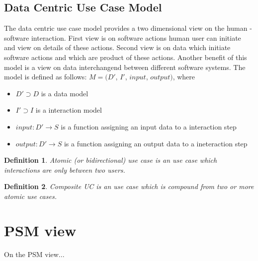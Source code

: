 \documentclass[10pt,a4paper]{article}
\newtheorem{mydef}{Definition}
\begin{document}
\subsection{Data Centric Use Case Model}
The data centric use case model provides a two dimensional view on the human - software interaction. First view is on software actions human user can initiate and view on details of these actions. Second view is on data which initiate software actions and which are product of these actions. Another benefit of this model is a view on data interchangend between different software systems. The model is defined as follows:
$M = (D'$, $I'$, $input$, $output)$, where
\begin{itemize}
	\item $D' \supset D $ is a data model
	\item $I' \supset I$ is a interaction model
	\item $input: D' \rightarrow S$ is a function assigning an input data to a interaction step
	\item $output: D' \rightarrow S$ is a function assigning an output data to a ineteraction step
\end{itemize}

\begin{mydef}
Atomic (or bidirectional) use case is an use case which interactions are only between two users.
\end{mydef}


\begin{mydef}
Composite UC is an use case which is compound from two or more atomic use cases.
\end{mydef}

\section{PSM view}
On the PSM view...

\end{document}
